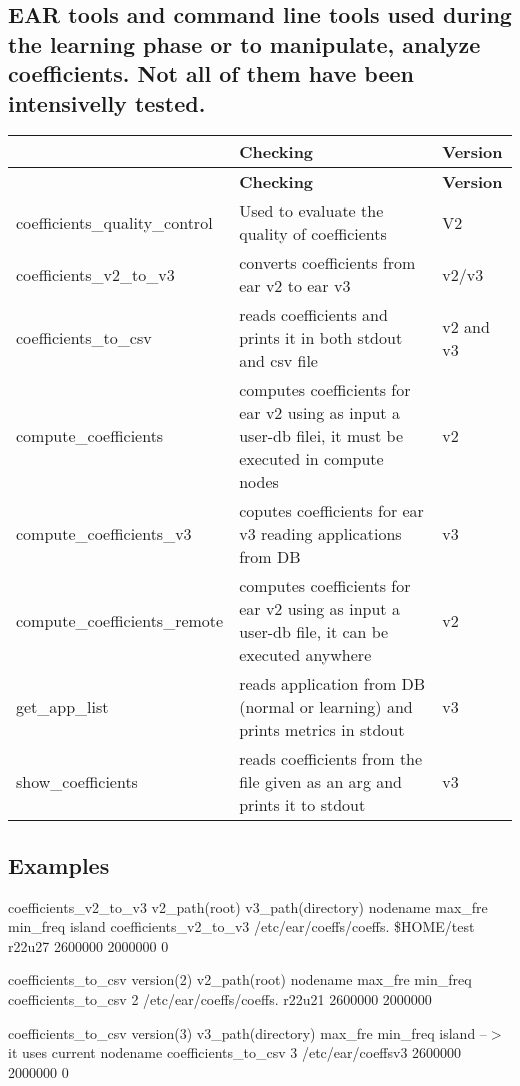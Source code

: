 \subsection*{E\+AR tools and command line tools used during the learning phase or to manipulate, analyze coefficients. Not all of them have been intensivelly tested. }

\tabulinesep=1mm
\begin{longtabu} spread 0pt [c]{*3{|X[-1]}|}
\hline
{}&{\bf Checking }&{\bf Version  }\\
\endfirsthead
\hline
\endfoot
\hline
{}&{\bf Checking }&{\bf Version  }\\
\endhead
coefficients\+\_\+quality\+\_\+control &Used to evaluate the quality of coefficients &V2 \\
coefficients\+\_\+v2\+\_\+to\+\_\+v3 &converts coefficients from ear v2 to ear v3 &v2/v3 \\
coefficients\+\_\+to\+\_\+csv &reads coefficients and prints it in both stdout and csv file &v2 and v3 \\
compute\+\_\+coefficients &computes coefficients for ear v2 using as input a user-\/db filei, it must be executed in compute nodes &v2 \\
compute\+\_\+coefficients\+\_\+v3 &coputes coefficients for ear v3 reading applications from DB &v3 \\
compute\+\_\+coefficients\+\_\+remote &computes coefficients for ear v2 using as input a user-\/db file, it can be executed anywhere &v2 \\
get\+\_\+app\+\_\+list &reads application from DB (normal or learning) and prints metrics in stdout &v3 \\
show\+\_\+coefficients &reads coefficients from the file given as an arg and prints it to stdout&v3 \\
\end{longtabu}


\subsection*{Examples }


\begin{DoxyItemize}
\item coefficients\+\_\+v2\+\_\+to\+\_\+v3 v2\+\_\+path(root) v3\+\_\+path(directory) nodename max\+\_\+fre min\+\_\+freq island coefficients\+\_\+v2\+\_\+to\+\_\+v3 /etc/ear/coeffs/coeffs. \$\+H\+O\+ME/test r22u27 2600000 2000000 0
\item coefficients\+\_\+to\+\_\+csv version(2) v2\+\_\+path(root) nodename max\+\_\+fre min\+\_\+freq coefficients\+\_\+to\+\_\+csv 2 /etc/ear/coeffs/coeffs. r22u21 2600000 2000000
\item coefficients\+\_\+to\+\_\+csv version(3) v3\+\_\+path(directory) max\+\_\+fre min\+\_\+freq island --$>$ it uses current nodename coefficients\+\_\+to\+\_\+csv 3 /etc/ear/coeffsv3 2600000 2000000 0 
\end{DoxyItemize}